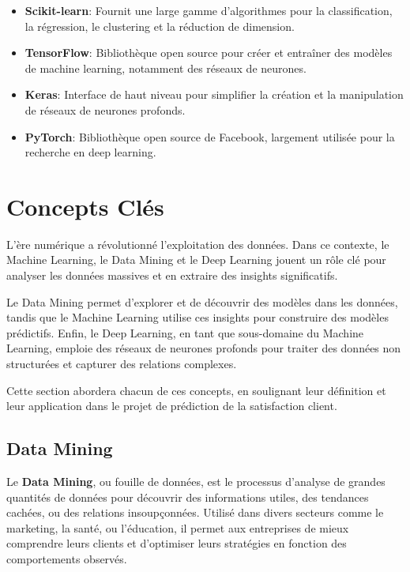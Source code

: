 \begin{itemize}
\begin{itemize}
        \item \textbf{Scikit-learn}: Fournit une large gamme d'algorithmes pour la classification, la régression, le clustering et la réduction de dimension.
        \item \textbf{TensorFlow}: Bibliothèque open source pour créer et entraîner des modèles de machine learning, notamment des réseaux de neurones.        \item \textbf{Keras}: Interface de haut niveau pour simplifier la création et la manipulation de réseaux de neurones profonds.
        \item \textbf{PyTorch}: Bibliothèque open source de Facebook, largement utilisée pour la recherche en deep learning.    \end{itemize}
\end{itemize}

\section{Concepts Clés}
L'ère numérique a révolutionné l'exploitation des données. Dans ce contexte, le Machine Learning, le Data Mining et le Deep Learning jouent un rôle clé pour analyser les données massives et en extraire des insights significatifs. 

Le Data Mining permet d'explorer et de découvrir des modèles dans les données, tandis que le Machine Learning utilise ces insights pour construire des modèles prédictifs. Enfin, le Deep Learning, en tant que sous-domaine du Machine Learning, emploie des réseaux de neurones profonds pour traiter des données non structurées et capturer des relations complexes.

Cette section abordera chacun de ces concepts, en soulignant leur définition et leur application dans le projet de prédiction de la satisfaction client.

\subsection{Data Mining}

Le \textbf{Data Mining}, ou fouille de données, est le processus d'analyse de grandes quantités de données pour découvrir des informations utiles, des tendances cachées, ou des relations insoupçonnées. Utilisé dans divers secteurs comme le marketing, la santé, ou l'éducation, il permet aux entreprises de mieux comprendre leurs clients et d'optimiser leurs stratégies en fonction des comportements observés.

